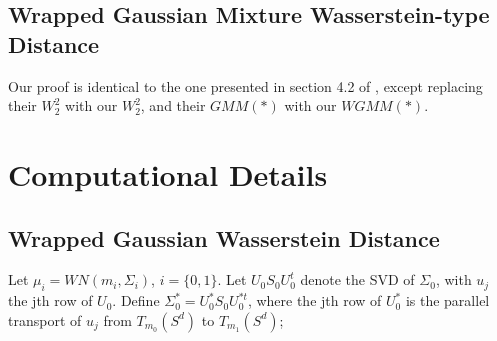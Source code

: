 \documentclass[]{article}
\begin{document}
%
%
%
%
%

\subsection{Wrapped Gaussian Mixture Wasserstein-type Distance}

Our proof is identical to the one presented in section 4.2 of \cite{https://doi.org/10.48550/arxiv.1907.05254}, except replacing their $W_2^2$ with our $W_2^2$, and their $GMM(*)$ with our $WGMM(*)$. 


\newpage

\section{Computational Details}\label{section: implementation}

\subsection{Wrapped Gaussian Wasserstein Distance}

Let $\mu_i = WN(m_i,\Sigma_i)$, $i = \{0, 1\}$. Let $U_0 S_0 U_0^t$ denote the SVD of $\Sigma_0$, with $u_j$ the jth row of $U_0$. Define $\Sigma_0^* = U_0^* S_0 U_0^{*t}$, where the jth row of $U_0^*$ is the parallel transport of $u_j$ from $T_{m_0}(S^d)$ to $T_{m_1}(S^d)$;

%
\end{document}
